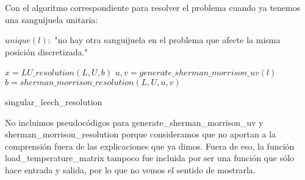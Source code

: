 Con el algoritmo correspondiente para resolver el problema cuando ya tenemos una sanguijuela unitaria:

\begin{algorithm}[H]
 \vspace{0.5cm}	
 
	$unique(l):$ "no hay otra sanguijuela en el problema que afecte la misma posición discretizada."
 	\vspace{0.5cm}
	
	 {
		$x = LU\_resolution(L,U,b)$
	}{
		$u,v = generate\_sherman\_morrison\_uv(l)$\\
		$b = sherman\_morrison\_resolution(L,U,u,v)$
	}
 	\vspace{0.5cm}
 	
	
\caption{singular\_leech\_resolution\label{alg_singular_leech_resoluton}}  
\end{algorithm} 

No incluimos pseudocódigos para generate\_sherman\_morrison\_uv y sherman\_morrison\_resolution porque consideramos que no aportan a la comprensión fuera de las explicaciones que ya dimos. Fuera de eso, la función load\_temperature\_matrix tampoco fue incluida por ser una función que sólo hace entrada y salida, por lo que no vemos el sentido de mostrarla.